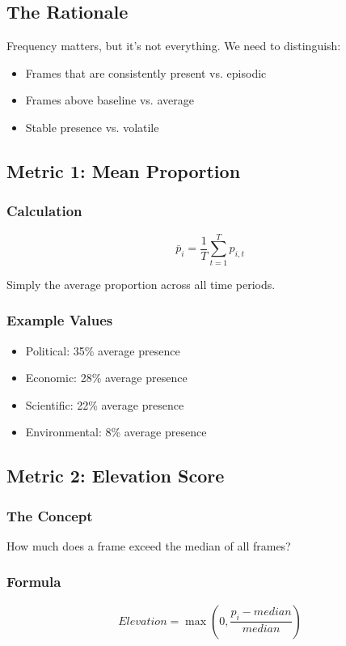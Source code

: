 \documentclass[11pt]{article}
\begin{document}
\subsection{The Rationale}

Frequency matters, but it's not everything. We need to distinguish:
\begin{itemize}
    \item Frames that are consistently present vs. episodic
    \item Frames above baseline vs. average
    \item Stable presence vs. volatile
\end{itemize}

\subsection{Metric 1: Mean Proportion}

\subsubsection{Calculation}
\[\bar{p}_i = \frac{1}{T} \sum_{t=1}^{T} p_{i,t}\]

Simply the average proportion across all time periods.

\subsubsection{Example Values}
\begin{itemize}
    \item Political: 35\% average presence
    \item Economic: 28\% average presence
    \item Scientific: 22\% average presence
    \item Environmental: 8\% average presence
\end{itemize}

\subsection{Metric 2: Elevation Score}

\subsubsection{The Concept}
How much does a frame exceed the median of all frames?

\subsubsection{Formula}
\[Elevation = \max\left(0, \frac{p_i - median}{median}\right)\]
\end{document}
